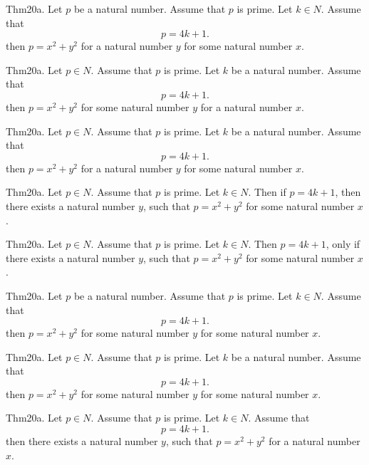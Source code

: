 \documentclass{article}
\begin{document}
Thm20a. Let $p$ be a natural number. Assume that $p$ is prime. Let $k \in N$. Assume that $$p = 4 k + 1.$$ then $p = x ^{ 2}+ y ^{ 2}$ for a natural number $y$ for some natural number $x$.

Thm20a. Let $p \in N$. Assume that $p$ is prime. Let $k$ be a natural number. Assume that $$p = 4 k + 1.$$ then $p = x ^{ 2}+ y ^{ 2}$ for some natural number $y$ for a natural number $x$.

Thm20a. Let $p \in N$. Assume that $p$ is prime. Let $k$ be a natural number. Assume that $$p = 4 k + 1.$$ then $p = x ^{ 2}+ y ^{ 2}$ for a natural number $y$ for some natural number $x$.

Thm20a. Let $p \in N$. Assume that $p$ is prime. Let $k \in N$. Then if $p = 4 k + 1$, then there exists a natural number $y$, such that $p = x ^{ 2}+ y ^{ 2}$ for some natural number $x$.

Thm20a. Let $p \in N$. Assume that $p$ is prime. Let $k \in N$. Then $p = 4 k + 1$, only if there exists a natural number $y$, such that $p = x ^{ 2}+ y ^{ 2}$ for some natural number $x$.

Thm20a. Let $p$ be a natural number. Assume that $p$ is prime. Let $k \in N$. Assume that $$p = 4 k + 1.$$ then $p = x ^{ 2}+ y ^{ 2}$ for some natural number $y$ for some natural number $x$.

Thm20a. Let $p \in N$. Assume that $p$ is prime. Let $k$ be a natural number. Assume that $$p = 4 k + 1.$$ then $p = x ^{ 2}+ y ^{ 2}$ for some natural number $y$ for some natural number $x$.

Thm20a. Let $p \in N$. Assume that $p$ is prime. Let $k \in N$. Assume that $$p = 4 k + 1.$$ then there exists a natural number $y$, such that $p = x ^{ 2}+ y ^{ 2}$ for a natural number $x$.
\end{document}

